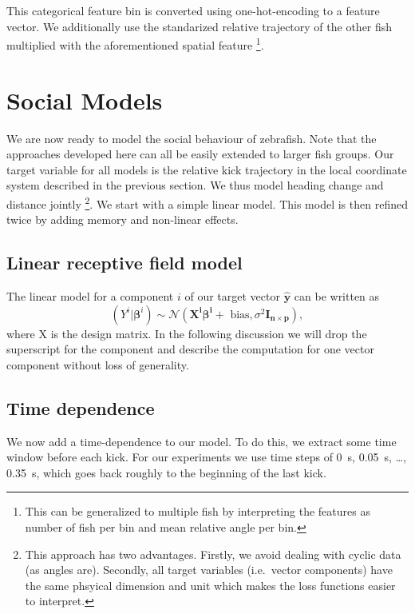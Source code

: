 \documentclass[nobib]{tufte-handout}
\begin{document}
This categorical feature bin is converted using one-hot-encoding to a feature vector.
We additionally use the standarized relative trajectory of the other fish multiplied with the aforementioned spatial feature%
\footnote{This can be generalized to multiple fish by interpreting the features as number of fish per bin and mean relative angle per bin.}.

\section{Social Models}\label{sec:social}
We are now ready to model the social behaviour of zebrafish.
Note that the approaches developed here can all be easily extended to larger fish groups.
Our target variable for all models is the relative kick trajectory in the local coordinate system described in the previous section.
We thus model heading change and distance jointly%
\footnote{This approach has two advantages.
  Firstly, we avoid dealing with cyclic data (as angles are).
Secondly, all target variables (i.e.\ vector components) have the same phsyical dimension and unit which makes the loss functions easier to interpret.}.
We start with a simple linear model.
This model is then refined twice by adding memory and non-linear effects.

\subsection{Linear receptive field model}
The linear model for a component \(i\) of our target vector \(\hat{\bm{y}}\) can be written as
\begin{equation*}
 \left( Y^i | \bm{\beta}^{i} \right)  \sim \mathcal{N} \left( \bm{X^i} \bm{\beta^i} + \text{ bias}, \sigma^2 \bm{I_{n \times p}}  \right),
\end{equation*}
where X is the design matrix.
In the following discussion we will drop the superscript for the component and describe the computation for one vector component without loss of generality.

\subsection{Time dependence}
We now add a time-dependence to our model.
To do this, we extract some time window before each kick.
For our experiments we use time steps of \SI{0}{\s}, \SI{0.05}{s}, \ldots, \SI{0.35}{\s}, which goes back roughly to the beginning of the last kick.
\end{document}
